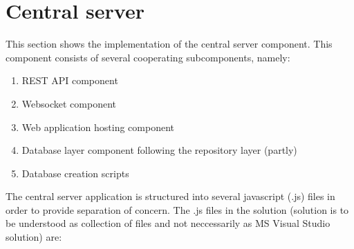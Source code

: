 \section {Central server}
\label {sec:implserver}

This section shows the implementation of the central server component. This component consists of several cooperating subcomponents, namely:
\begin{enumerate}
	\item REST API component
	\item Websocket component
	\item Web application hosting component
	\item Database layer component following the repository layer (partly)
	\item Database creation scripts
\end{enumerate}

\smallskip
The central server application is structured into several javascript (.js) files in order to provide separation of concern. The .js files in the solution (solution is to be understood as collection of files and not neccessarily as MS Visual Studio solution) are:

